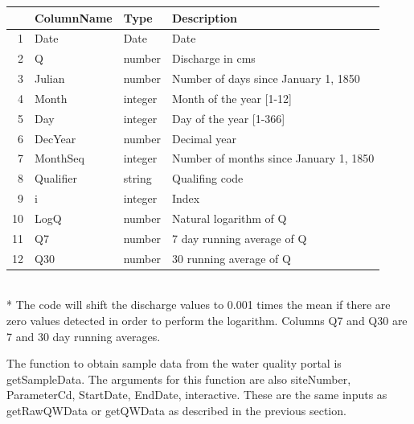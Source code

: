\documentclass[a4paper,11pt]{article}
\begin{document}
\begin{tabular}{rlll}
  \hline
 & ColumnName & Type & Description \\ 
  \hline
1 & Date & Date & Date \\ 
  2 & Q & number & Discharge in cms \\ 
  3 & Julian & number & Number of days since January 1, 1850 \\ 
  4 & Month & integer & Month of the year [1-12] \\ 
  5 & Day & integer & Day of the year [1-366] \\ 
  6 & DecYear & number & Decimal year \\ 
  7 & MonthSeq & integer & Number of months since January 1, 1850 \\ 
  8 & Qualifier & string & Qualifing code \\ 
  9 & i & integer & Index \\ 
  10 & LogQ & number & Natural logarithm of Q \\ 
  11 & Q7 & number & 7 day running average of Q \\ 
  12 & Q30 & number & 30 running average of Q \\ 
   \hline
\end{tabular}\\*
The code will shift the discharge values to 0.001 times the mean if there are zero values detected in order to perform the logarithm. Columns Q7 and Q30 are 7 and 30 day running averages. 

The function to obtain sample data from the water quality portal is getSampleData. The arguments for this function are also siteNumber, ParameterCd, StartDate, EndDate, interactive. These are the same inputs as getRawQWData or getQWData as described in the previous section.
\end{document}
